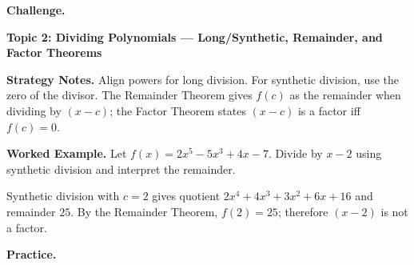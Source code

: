 \documentclass[12pt]{exam}
\begin{document}
\begin{questions}
\textbf{Challenge.}

\newpage

\question
\textbf{Topic 2: Dividing Polynomials --- Long/Synthetic, Remainder, and Factor Theorems}

\textbf{Strategy Notes.} Align powers for long division. For synthetic division, use the zero of the divisor. The Remainder Theorem gives $f(c)$ as the remainder when dividing by $(x-c)$; the Factor Theorem states $(x-c)$ is a factor iff $f(c)=0$.

\textbf{Worked Example.} Let $f(x)=2x^5-5x^3+4x-7$. Divide by $x-2$ using synthetic division and interpret the remainder.

Synthetic division with $c=2$ gives quotient $2x^4+4x^3+3x^2+6x+16$ and remainder $25$. By the Remainder Theorem, $f(2)=25$; therefore $(x-2)$ is not a factor.

\vspace{0.2cm}
\textbf{Practice.}


\end{questions}
\end{document}
